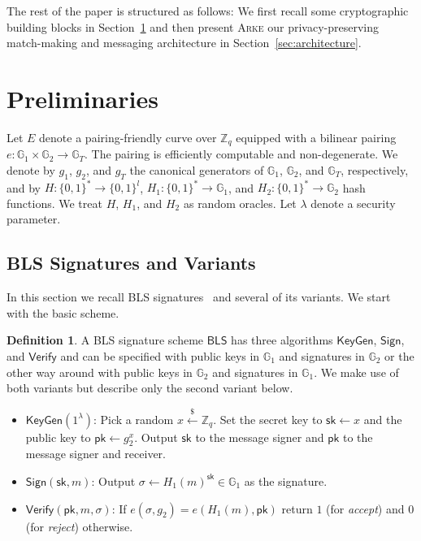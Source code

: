 \documentclass[11pt,letterpaper]{article}
\theoremstyle{definition}
\newtheorem{definition}[theorem]{Definition}
\newcommand{\GG}{\mathbb{G}}
\newcommand{\ZZ}{\mathbb{Z}}
\newcommand{\pk}{\mathsf{pk}}
\newcommand{\sk}{\mathsf{sk}}
\newcommand{\pick}{\xleftarrow{\scriptscriptstyle \$}}
\newcommand{\bls}{\mathsf{BLS}}
\newcommand{\keygen}{\mathsf{KeyGen}}
\newcommand{\sign}{\mathsf{Sign}}
\newcommand{\verify}{\mathsf{Verify}}
\newcommand{\sys}{\textsc{Arke}\xspace}
\begin{document}
The rest of the paper is structured as follows: We first recall some
cryptographic building blocks in Section~\ref{sec:preliminaries} and then
present \sys our privacy-preserving match-making and messaging architecture in
Section~\ref{sec:architecture}.


\section{Preliminaries}\label{sec:preliminaries}

Let $E$ denote a pairing-friendly curve over $\ZZ_q$ equipped with a bilinear
pairing $e: \GG_1 \times \GG_2 \rightarrow \GG_T$. The pairing is efficiently
computable and non-degenerate. We denote by $g_1$, $g_2$, and $g_T$ the
canonical generators of $\GG_1$, $\GG_2$, and $\GG_T$, respectively, and by $H:
  \{0,1\}^{\ast} \rightarrow \{0,1\}^l$, $H_1: \{0,1\}^{\ast} \rightarrow \GG_1$,
and $H_2: \{0,1\}^{\ast} \rightarrow \GG_2$ hash functions. We treat $H$, $H_1$,
and $H_2$ as random oracles. Let $\lambda$ denote a security parameter.

\subsection{BLS Signatures and Variants}\label{sec:bls}

In this section we recall BLS signatures~\cite{boneh2001short} and several of
its variants. We start with the basic scheme.

\begin{definition}

  A BLS signature scheme $\bls$ has three algorithms $\keygen$, $\sign$, and
  $\verify$ and can be specified with public keys in $\GG_1$ and signatures in
  $\GG_2$ or the other way around with public keys in $\GG_2$ and signatures in
  $\GG_1$. We make use of both variants but describe only the second variant
  below.

  \begin{itemize}

    \item[] $\keygen(1^\lambda)$: Pick a random $x \pick \ZZ_q$. Set the secret
      key to $\sk \leftarrow x$ and the public key to $\pk \leftarrow g_2^x$.
      Output $\sk$ to the message signer and $\pk$ to the message signer and
      receiver.

    \item[] $\sign(\sk, m)$: Output $\sigma \leftarrow H_1(m)^\sk \in
        \mathbb{G}_1$ as the signature.

    \item[] $\verify(\pk, m, \sigma)$: If $e(\sigma, g_2) = e(H_1(m), \pk)$
      return $1$ (for \emph{accept}) and $0$ (for \emph{reject}) otherwise.

  \end{itemize}

\end{definition}
\end{document}
